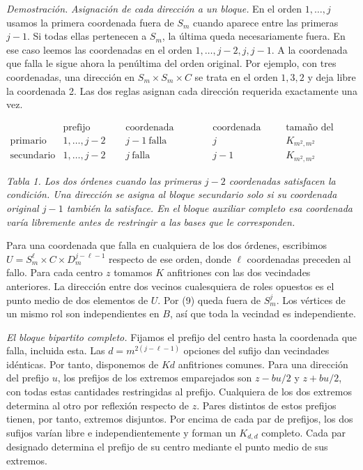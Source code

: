 \documentclass[spanish,11pt,a4paper]{article}
\begin{document}
\emph{Demostración.} \emph{Asignación de cada dirección a un bloque.} En el orden \(1,\ldots,j\) usamos la primera coordenada fuera de \(S_m\) cuando aparece entre las primeras \(j-1\). Si todas ellas pertenecen a \(S_m\), la última queda necesariamente fuera. En ese caso leemos las coordenadas en el orden \(1,\ldots,j-2,j,j-1\). A la coordenada que falla le sigue ahora la penúltima del orden original. Por ejemplo, con tres coordenadas, una dirección en \(S_m\times S_m\times C\) se trata en el orden \(1,3,2\) y deja libre la coordenada 2. Las dos reglas asignan cada dirección requerida exactamente una vez.

\[\begin{array}{c|ccc|c}
 &\text{prefijo común}&\text{coordenada siguiente}&\text{coordenada libre}&\text{tamaño del bloque}\\ \hline
 \text{primario}&1,\ldots,j-2&j-1\ \text{falla}&j&K_{m^2,m^2}\\
 \text{secundario}&1,\ldots,j-2&j\ \text{falla}&j-1&K_{m^2,m^2}
\end{array}\]

\emph{Tabla 1. Los dos órdenes cuando las primeras \(j-2\) coordenadas satisfacen la condición. Una dirección se asigna al bloque secundario solo si su coordenada original \(j-1\) también la satisface. En el bloque auxiliar completo esa coordenada varía libremente antes de restringir a las bases que le corresponden.}

Para una coordenada que falla en cualquiera de los dos órdenes, escribimos \(U=S_m^\ell\times C\times D_m^{j-\ell-1}\) respecto de ese orden, donde \(\ell\) coordenadas preceden al fallo. Para cada centro \(z\) tomamos \(K\) anfitriones con las dos vecindades anteriores. La dirección entre dos vecinos cualesquiera de roles opuestos es el punto medio de dos elementos de \(U\). Por (9) queda fuera de \(S_m^j\). Los vértices de un mismo rol son independientes en \(B\), así que toda la vecindad es independiente.

\emph{El bloque bipartito completo.} Fijamos el prefijo del centro hasta la coordenada que falla, incluida esta. Las \(d=m^{2(j-\ell-1)}\) opciones del sufijo dan vecindades idénticas. Por tanto, disponemos de \(Kd\) anfitriones comunes. Para una dirección del prefijo \(u\), los prefijos de los extremos emparejados son \(z-bu/2\) y \(z+bu/2\), con todas estas cantidades restringidas al prefijo. Cualquiera de los dos extremos determina al otro por reflexión respecto de \(z\). Pares distintos de estos prefijos tienen, por tanto, extremos disjuntos. Por encima de cada par de prefijos, los dos sufijos varían libre e independientemente y forman un \(K_{d,d}\) completo. Cada par designado determina el prefijo de su centro mediante el punto medio de sus extremos.
\end{document}
